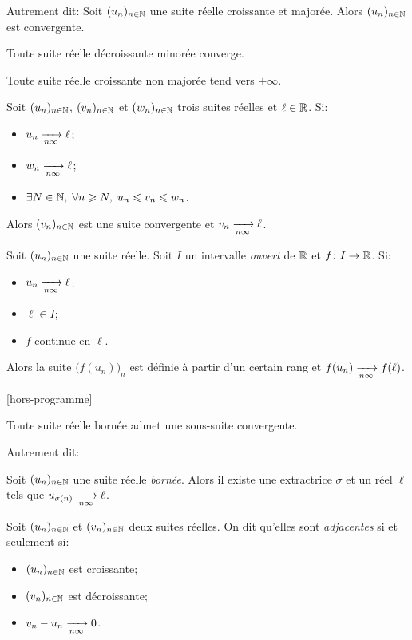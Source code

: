 \documentclass{yann}
\newcommand\U{(u_n)_{n\in\N}}
\newcommand\V{(v_n)_{n\in\N}}
\begin{document}
Autrement dit:
Soit $\U$ une suite réelle croissante et majorée.
Alors $\U$ est convergente.


Toute suite réelle décroissante minorée converge.


Toute suite réelle croissante non majorée tend vers $+\infty$.


Soit $(u_n)_{n\in\mathbb{N}}$, $(v_n)_{n\in\mathbb{N}}$ et $(w_n)_{n\in\mathbb{N}}$ trois suites réelles et $\ell\in\mathbb{R}$.
Si:
\begin{itemize}
\item
$u_n \xrightarrow[{n\infty}]{}\ell$;
\item
$w_n \xrightarrow[{n\infty}]{}\ell$;
\item
$\exists N\in\mathbb{N} ,\; \forall n\geqslant N ,\; u_n\leqslant v_n\leqslant w_n$.
\end{itemize}

Alors $(v_n)_{n\in\mathbb{N}}$ est une suite convergente et $v_n \xrightarrow[{n\infty}]{}\ell$.


Soit $\U$ une suite réelle.
Soit $I$ un intervalle \emph{ouvert} de $\mathbb{R}$ et $f\colon I\to\mathbb{R}$.
Si:
\begin{itemize}
\item
$u_n \xrightarrow[{n\infty}]{}\ell$;
\item
$\ell\in I$;
\item
$f$ continue en $\ell$.
\end{itemize}

Alors la suite $\bigl( f(u_n) \bigr)_n$ est définie à partir d'un certain rang et
$f(u_n) \xrightarrow[{n\infty}]{} f(\ell)$.

[hors-programme]

Toute suite réelle bornée admet une sous-suite convergente.

Autrement dit:

Soit $\U$ une suite réelle \emph{bornée}.
Alors il existe une extractrice $\sigma$
et un réel $\ell$ tels que $u_{\sigma(n)} \xrightarrow[{n\infty}]{}\ell$.


Soit $\U$ et $\V$ deux suites réelles.
On dit qu'elles sont \emph{adjacentes} si et seulement si:
\begin{itemize}
\item
$\U$ est croissante;
\item
$\V$ est décroissante;
\item
$v_n - u_n \xrightarrow[{n\infty}]{} 0$.
\end{itemize}
\end{document}
